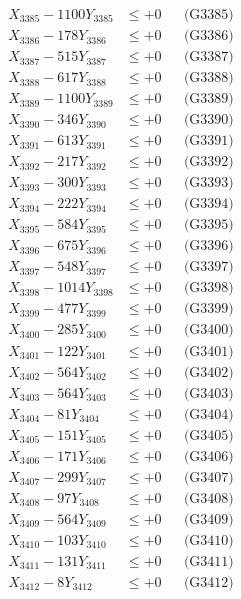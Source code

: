 \documentclass[a4paper,10pt]{article}
\begin{document}
{\begin{align}
X_{3385} - 1100Y_{3385} &\leq +0 && \text{(G3385)} \\
X_{3386} - 178Y_{3386} &\leq +0 && \text{(G3386)} \\
X_{3387} - 515Y_{3387} &\leq +0 && \text{(G3387)} \\
X_{3388} - 617Y_{3388} &\leq +0 && \text{(G3388)} \\
X_{3389} - 1100Y_{3389} &\leq +0 && \text{(G3389)} \\
X_{3390} - 346Y_{3390} &\leq +0 && \text{(G3390)} \\
\allowbreak
X_{3391} - 613Y_{3391} &\leq +0 && \text{(G3391)} \\
X_{3392} - 217Y_{3392} &\leq +0 && \text{(G3392)} \\
X_{3393} - 300Y_{3393} &\leq +0 && \text{(G3393)} \\
X_{3394} - 222Y_{3394} &\leq +0 && \text{(G3394)} \\
X_{3395} - 584Y_{3395} &\leq +0 && \text{(G3395)} \\
X_{3396} - 675Y_{3396} &\leq +0 && \text{(G3396)} \\
X_{3397} - 548Y_{3397} &\leq +0 && \text{(G3397)} \\
X_{3398} - 1014Y_{3398} &\leq +0 && \text{(G3398)} \\
X_{3399} - 477Y_{3399} &\leq +0 && \text{(G3399)} \\
X_{3400} - 285Y_{3400} &\leq +0 && \text{(G3400)} \\
\allowbreak
X_{3401} - 122Y_{3401} &\leq +0 && \text{(G3401)} \\
X_{3402} - 564Y_{3402} &\leq +0 && \text{(G3402)} \\
X_{3403} - 564Y_{3403} &\leq +0 && \text{(G3403)} \\
X_{3404} - 81Y_{3404} &\leq +0 && \text{(G3404)} \\
X_{3405} - 151Y_{3405} &\leq +0 && \text{(G3405)} \\
X_{3406} - 171Y_{3406} &\leq +0 && \text{(G3406)} \\
X_{3407} - 299Y_{3407} &\leq +0 && \text{(G3407)} \\
X_{3408} - 97Y_{3408} &\leq +0 && \text{(G3408)} \\
X_{3409} - 564Y_{3409} &\leq +0 && \text{(G3409)} \\
X_{3410} - 103Y_{3410} &\leq +0 && \text{(G3410)} \\
\allowbreak
X_{3411} - 131Y_{3411} &\leq +0 && \text{(G3411)} \\
X_{3412} - 8Y_{3412} &\leq +0 && \text{(G3412)} \\

\end{align}}
\end{document}

